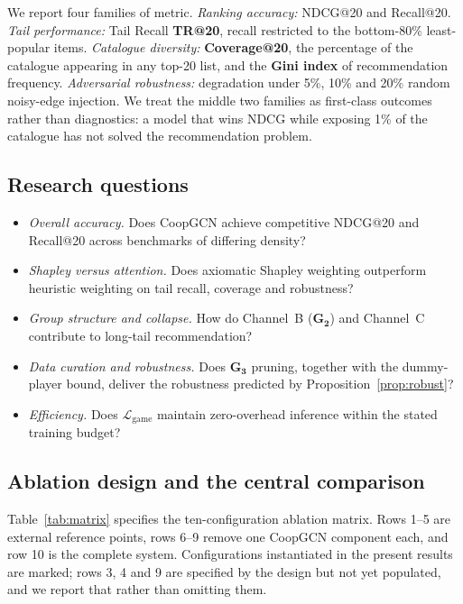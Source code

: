 \documentclass[final,5p,times,twocolumn]{elsarticle}
\begin{document}
We report four families of metric. \emph{Ranking accuracy:} NDCG@20 and
Recall@20. \emph{Tail performance:} Tail Recall \textbf{TR@20}, recall
restricted to the bottom-80\% least-popular items. \emph{Catalogue diversity:}
\textbf{Coverage@20}, the percentage of the catalogue appearing in any top-20
list, and the \textbf{Gini index} of recommendation frequency.
\emph{Adversarial robustness:} degradation under 5\%, 10\% and 20\% random
noisy-edge injection. We treat the middle two families as first-class outcomes
rather than diagnostics: a model that wins NDCG while exposing 1\% of the
catalogue has not solved the recommendation problem.

\subsection{Research questions}
\label{sec:rqs}

\begin{itemize}
\item[\textbf{RQ1}] \emph{Overall accuracy.} Does CoopGCN achieve competitive
NDCG@20 and Recall@20 across benchmarks of differing density?
\item[\textbf{RQ2}] \emph{Shapley versus attention.} Does axiomatic Shapley
weighting outperform heuristic weighting on tail recall, coverage and
robustness?
\item[\textbf{RQ3}] \emph{Group structure and collapse.} How do Channel~B
($\mathbf{G_2}$) and Channel~C contribute to long-tail recommendation?
\item[\textbf{RQ4}] \emph{Data curation and robustness.} Does $\mathbf{G_3}$
pruning, together with the dummy-player bound, deliver the robustness
predicted by Proposition~\ref{prop:robust}?
\item[\textbf{RQ5}] \emph{Efficiency.} Does $\mathcal{L}_{\mathrm{game}}$
maintain zero-overhead inference within the stated training budget?
\end{itemize}

\subsection{Ablation design and the central comparison}
\label{sec:central}

Table~\ref{tab:matrix} specifies the ten-configuration ablation matrix. Rows
1--5 are external reference points, rows 6--9 remove one CoopGCN component
each, and row 10 is the complete system. Configurations instantiated in the
present results are marked; rows 3, 4 and 9 are specified by the design but
not yet populated, and we report that rather than omitting them.
\end{document}
